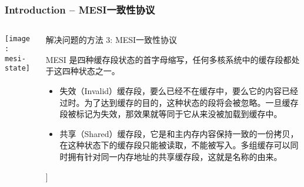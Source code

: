 \begin{frame}[plain]	
	\frametitle{Introduction -- MESI一致性协议}
	
	
	\begin{columns}
		
		\begin{column}{.4\textwidth}
			\texttt{[image: mesi-state]}
		\end{column}
		\begin{column}{.6\textwidth}
			解决问题的方法 3: MESI一致性协议
			
			MESI 是四种缓存段状态的首字母缩写，任何多核系统中的缓存段都处于这四种状态之一。
			\begin{itemize}
				\item 失效（Invalid）缓存段，要么已经不在缓存中，要么它的内容已经过时。为了达到缓存的目的，这种状态的段将会被忽略。一旦缓存段被标记为失效，那效果就等同于它从来没被加载到缓存中。
				\item 共享（Shared）缓存段，它是和主内存内容保持一致的一份拷贝，在这种状态下的缓存段只能被读取，不能被写入。多组缓存可以同时拥有针对同一内存地址的共享缓存段，这就是名称的由来。
			\end{itemize}
]
		\end{column}
	\end{columns}
	
\end{frame}



